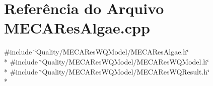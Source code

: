 \section{Referência do Arquivo M\+E\+C\+A\+Res\+Algae.\+cpp}
\label{_m_e_c_a_res_algae_8cpp}
{\ttfamily \#include \char`\"{}Quality/\+M\+E\+C\+A\+Res\+W\+Q\+Model/\+M\+E\+C\+A\+Res\+Algae.\+h\char`\"{}}\\*
{\ttfamily \#include \char`\"{}Quality/\+M\+E\+C\+A\+Res\+W\+Q\+Model/\+M\+E\+C\+A\+Res\+W\+Q\+Model.\+h\char`\"{}}\\*
{\ttfamily \#include \char`\"{}Quality/\+M\+E\+C\+A\+Res\+W\+Q\+Model/\+M\+E\+C\+A\+Res\+W\+Q\+Result.\+h\char`\"{}}\\*
